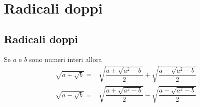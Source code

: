 \chapter{Radicali doppi}\label{ch:radicalidoppi}
\section{Radicali doppi}
\begin{thm}\label{thm:Radicalidoppi1}
Se  $a$ e $b$ sono numeri interi allora
\begin{align*}
		\sqrt{a+\sqrt{b}}=&\sqrt{\dfrac{a+\sqrt{a^2-b}}{2}}+\sqrt{\dfrac{a-\sqrt{a^2-b}}{2}}\\
		\sqrt{a-\sqrt{b}}=&\sqrt{\dfrac{a+\sqrt{a^2-b}}{2}}-\sqrt{\dfrac{a-\sqrt{a^2-b}}{2}}
		\\
\end{align*}
\end{thm}
